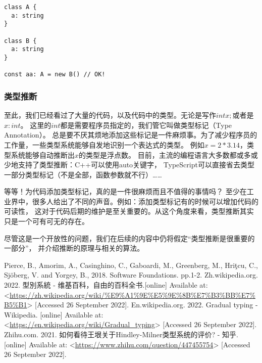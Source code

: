 \documentclass[../main.tex]{subfiles}
\begin{document}
\begin{lstlisting}
class A {
  a: string
}

class B {
  a: string
}

const aa: A = new B() // OK!
\end{lstlisting}

  \subsubsection*{类型推断}
  \indent 至此，我们已经看过了大量的代码，以及代码中的类型。无论是写作$int x;$或者是$x: int$。
  这里的$int$都是需要程序员指定的，我们管它叫做类型标记（Type Annotation）。
  总是要不厌其烦地添加这些标记是一件麻烦事。为了减少程序员的工作量，一些类型系统能够自发地识别一个表达式的类型。
  例如$x = 2 * 3.14$，类型系统能够自动推断出$x$的类型是浮点数。
  目前，主流的编程语言大多数都或多或少地支持了类型推断：C++可以使用auto关键字，
  TypeScript可以直接省去类型一部分类型标记（不是全部，函数参数就不行）……

  \indent 等等！为代码添加类型标记，真的是一件很麻烦而且不值得的事情吗？
  至少在工业界中，很多人给出了不同的声音。例如：添加类型标记有的时候可以增加代码的可读性，
  这对于代码后期的维护是至关重要的。从这个角度来看，类型推断其实只是一个可有可无的存在。 \cite{zh}

  \indent 尽管这是一个开放性的问题，我们在后续的内容中仍将假定“类型推断是很重要的一部分”，
  并介绍推断的原理与相关的算法。

  \begin{thebibliography}{4}
     Pierce, B., Amorim, A., Casinghino, C., Gaboardi, M., Greenberg, M., Hriţcu, C., Sjöberg, V. and Yorgey, B., 2018. Software Foundations. pp.1-2.
     Zh.wikipedia.org. 2022. 型別系統 - 维基百科，自由的百科全书.[online] Available at: <\url{https://zh.wikipedia.org/wiki/%E9%A1%9E%E5%9E%8B%E7%B3%BB%E7%B5%B1}> [Accessed 26 September 2022].
     En.wikipedia.org. 2022. Gradual typing - Wikipedia. [online] Available at: <\url{https://en.wikipedia.org/wiki/Gradual_typing}> [Accessed 26 September 2022].
     Zhihu.com. 2021. 如何看待王垠关于Hindley-Milner类型系统的评价? - 知乎. [online] Available at: <\url{https://www.zhihu.com/question/447455754}> [Accessed 26 September 2022].
  \end{thebibliography}
\end{document}
